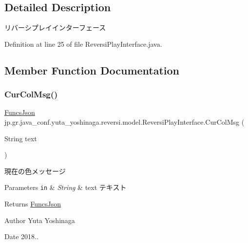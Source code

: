 \subsection{Detailed Description}
リバーシプレイインターフェース 

Definition at line 25 of file Reversi\+Play\+Interface.\+java.



\subsection{Member Function Documentation}
\mbox{\label{interfacejp_1_1gr_1_1java__conf_1_1yuta__yoshinaga_1_1reversi_1_1model_1_1_reversi_play_interface_a32a831288d0964d1c3a8bd58f539cfda}} 
\subsubsection{\texorpdfstring{Cur\+Col\+Msg()}{CurColMsg()}}
{\footnotesize\ttfamily \hyperlink{classjp_1_1gr_1_1java__conf_1_1yuta__yoshinaga_1_1reversi_1_1model_1_1_funcs_json}{Funcs\+Json} jp.\+gr.\+java\+\_\+conf.\+yuta\+\_\+yoshinaga.\+reversi.\+model.\+Reversi\+Play\+Interface.\+Cur\+Col\+Msg (\begin{DoxyParamCaption}\item[{String}]{text }\end{DoxyParamCaption})}



現在の色メッセージ 


\begin{DoxyParams}[1]{Parameters}
\mbox{\tt in}  & {\em String} & text テキスト \\
\hline
\end{DoxyParams}
\begin{DoxyReturn}{Returns}
\hyperlink{classjp_1_1gr_1_1java__conf_1_1yuta__yoshinaga_1_1reversi_1_1model_1_1_funcs_json}{Funcs\+Json} 
\end{DoxyReturn}
\begin{DoxyAuthor}{Author}
Yuta Yoshinaga 
\end{DoxyAuthor}
\begin{DoxyDate}{Date}
2018.. 
\end{DoxyDate}



